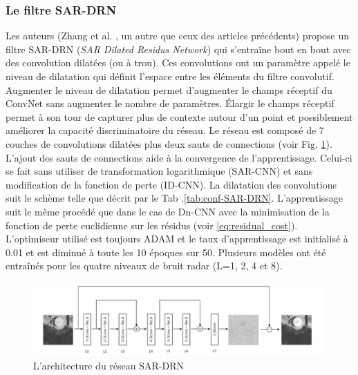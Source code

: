 \subsubsection{Le filtre SAR-DRN}

Les auteurs (Zhang et al. \cite{Zhang2018LearningSAR-DRN}, un autre que ceux des articles précédents) propose un filtre SAR-DRN (\textit {SAR Dilated Residus Network}) qui s'entraîne bout en bout avec des convolution dilatées (ou à trou).  Ces convolutions ont un paramètre appelé le niveau de dilatation qui définit l'espace entre les éléments du filtre convolutif. Augmenter le niveau de dilatation permet d'augmenter le champs réceptif du ConvNet sans augmenter le nombre de paramètres. Élargir le champs réceptif permet à son tour de capturer plus de contexte  autour d'un point et possiblement améliorer la capacité discriminatoire du réseau.  Le réseau est composé de 7 couches de convolutions dilatées plus deux sauts de connections (voir Fig. \ref{fig:SAR-DRN}).  L'ajout des sauts de connections aide à la convergence de l'apprentissage. Celui-ci se fait sans utiliser de transformation logarithmique (SAR-CNN) et sans modification de la fonction de perte (ID-CNN).  La dilatation des convolutions suit le schème telle que décrit par le Tab .\ref{tab:conf-SAR-DRN}.  L'apprentissage suit le même procédé que dans le cas de Dn-CNN avec la minimisation de la fonction de perte euclidienne sur les résidus (voir \ref{eq:residual_cost}).  L'optimiseur utilisé est toujours ADAM et le taux d'apprentissage est initialisé à 0.01 et est diminué à toute les 10 époques sur 50. Plusieurs modèles ont été entraînés pour les quatre niveaux de bruit radar (L=1, 2, 4 et 8).

\begin{figure}
  \includegraphics[width=\linewidth]{figures/geo6393/SAR-DRN.png}
   \centering
  \caption{L'architecture du réseau SAR-DRN}
  \label{fig:SAR-DRN}
\end{figure}


